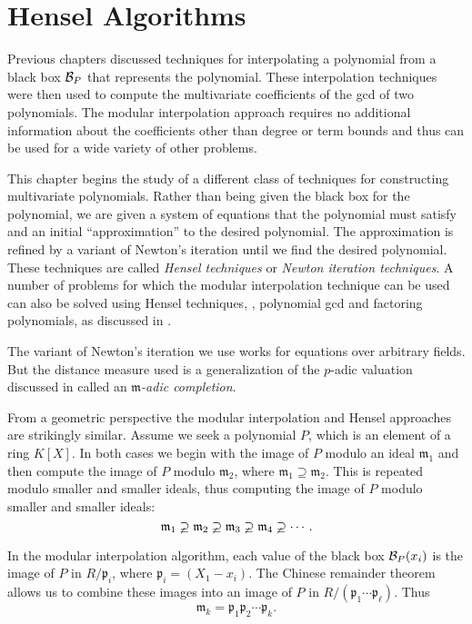 \chapter{Hensel Algorithms}
\label{Hensel:Chap}

Previous chapters discussed techniques for interpolating a polynomial
from a black box ${\cal B}_P$ that represents the polynomial.  These
interpolation techniques were then used to compute the multivariate
coefficients of the {\sc gcd} of two polynomials.  The modular interpolation
approach requires no additional information about the coefficients
other than degree or term bounds and thus can be used for a wide
variety of other problems.

This chapter begins the study of a different class of techniques for
constructing multivariate polynomials.  Rather than being given the
black box for the polynomial, we are given a system of equations that
the polynomial must satisfy and an initial ``approximation'' to the desired
polynomial.  The approximation is refined by a variant of Newton's
iteration until we find the desired polynomial.  These techniques are
called {\em Hensel techniques} or {\em Newton iteration techniques\/}.
A number of problems for which the modular interpolation technique can be 
used can also be solved using Hensel techniques, \eg, polynomial {\sc 
gcd} and factoring polynomials, as discussed in .  

The variant of Newton's iteration we use works for equations over
arbitrary fields.  But the distance measure used is a generalization
of the $p$-adic valuation discussed in 
called an {\em $\mathfrak{m}$-adic completion}.

From a geometric perspective the modular interpolation and Hensel
approaches are strikingly similar.  Assume we seek a polynomial $P$,
which is an element of a ring $K[X]$.  In both cases we begin with
the image of $P$ modulo an ideal $\mathfrak{m}_1$ and then compute the
image of $P$ modulo $\mathfrak{m}_2$, where $\mathfrak{m}_1 \supseteq 
\mathfrak{m}_2$.  This is repeated modulo smaller and smaller ideals, thus
computing the image of $P$ modulo smaller and smaller ideals:
\[
\mathfrak{m}_1 \varsupsetneq \mathfrak{m}_2 \varsupsetneq \mathfrak{m}_3 
  \varsupsetneq \mathfrak{m}_4 \varsupsetneq \cdots.
\]

In the modular interpolation algorithm, each value of the black box
${\cal B}_P(x_{i})$ is the image of $P$ in $R/\mathfrak{p}_i$, where
$\mathfrak{p}_i = (X_1 - x_{i})$.  The Chinese remainder theorem allows
us to combine these images into an image of $P$ in $R/(\mathfrak{p}_1
\cdots \mathfrak{p}_{\ell})$.  Thus
\[
\mathfrak{m}_k = \mathfrak{p}_1 \mathfrak{p}_2 \cdots \mathfrak{p}_k.
\]

